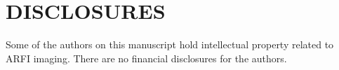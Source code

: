 \section*{DISCLOSURES}
Some of the authors on this manuscript hold intellectual property related to
ARFI imaging.  There are no financial disclosures for the authors.
